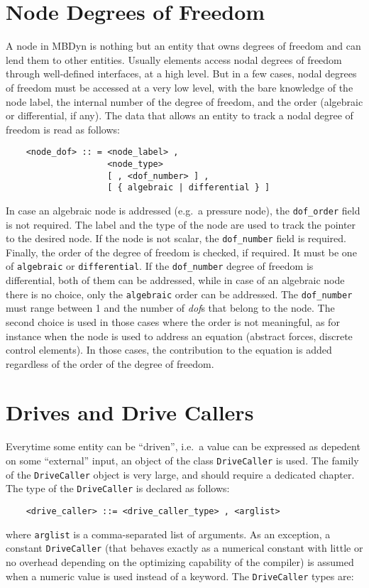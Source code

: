 \section{Node Degrees of Freedom}\label{sec:node_dof}
A node in MBDyn is nothing but an entity that owns degrees of freedom and
can lend them to other entities. 
Usually elements access nodal degrees of freedom through well-defined
interfaces, at a high level. 
But in a few cases, nodal degrees of freedom must be accessed
at a very low level, with the bare knowledge of the node label,
the internal number of the degree of freedom, and the order 
(algebraic or differential, if any).
The data that allows an entity to track a nodal degree of freedom is read as
follows:
\begin{verbatim}
    <node_dof> :: = <node_label> , 
                    <node_type> 
                    [ , <dof_number> ] ,
                    [ { algebraic | differential } ]
\end{verbatim}
In case an algebraic node is addressed (e.g.\ a pressure node), 
the \texttt{dof\_order} field is not required.
The label and the type of the node are used to track the pointer to the
desired node. 
If the node is not scalar, the \texttt{dof\_number} field is required.
Finally, the order of the degree of freedom is checked, if required.
It must be one of \texttt{algebraic} or \texttt{differential}.
If the \texttt{dof\_number} degree of freedom is differential, both
of them can be addressed, while in case of an algebraic node there is no
choice, only the \texttt{algebraic} order can be addressed.
The \texttt{dof\_number} must range between 1 and the number of {\em dof}s that
belong to the node.
The second choice is used in those cases where the order is not meaningful,
as for instance when the node is used to address an equation (abstract
forces, discrete control elements). 
In those cases, the contribution to the equation is added regardless 
of the order of the degree of freedom.

\section{Drives and Drive Callers}\label{sec:DRIVES}
Everytime some entity can be ``driven'', i.e.\ a value can be
expressed as depedent on some ``external'' input, an object of the class 
\texttt{DriveCaller} is used. 
The family of the \texttt{DriveCaller} object is very large, 
and should require a dedicated chapter.
The type of the \texttt{DriveCaller} is declared as follows:
\begin{verbatim}
    <drive_caller> ::= <drive_caller_type> , <arglist>
\end{verbatim}    
where \texttt{arglist} is a comma-separated list of arguments.
As an exception, a constant \texttt{DriveCaller} (that behaves exactly as a
numerical constant with little or no overhead depending on the optimizing
capability of the compiler) is assumed when a numeric value is used instead
of a keyword.
The \texttt{DriveCaller} types are:

